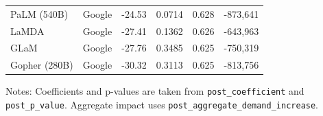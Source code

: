 \documentclass[sigconf,authordraft]{acmart}
\begin{document}
\begin{table}[htbp]
{\begin{threeparttable}
\begin{tabular}{l l r r r r}
PaLM (540B)                    & Google     & -24.53 & 0.0714                & 0.628 &  -873,641 \\
LaMDA                          & Google     & -27.41 & 0.1362                & 0.626 &  -643,963 \\
GLaM                           & Google     & -27.76 & 0.3485                & 0.625 &  -750,319 \\
Gopher (280B)                  & Google     & -30.32 & 0.3113                & 0.625 &  -813,756 \\
\bottomrule
\end{tabular}
\begin{tablenotes}
\item Notes: Coefficients and p-values are taken from \texttt{post\_coefficient} and \texttt{post\_p\_value}. Aggregate impact uses \texttt{post\_aggregate\_demand\_increase}.
\end{tablenotes}
\end{threeparttable}}
\label{PostTreatment}
\end{table}
\end{document}
